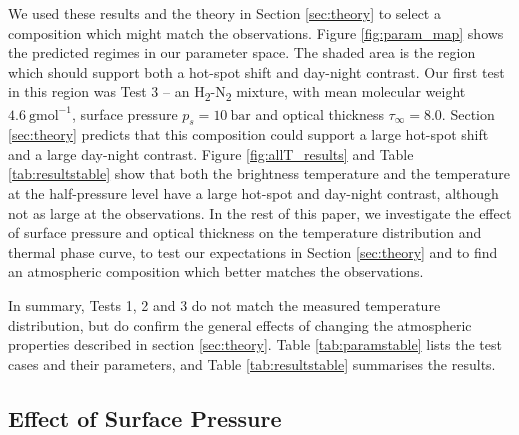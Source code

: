 We used these results and the theory in Section \ref{sec:theory} to select a composition which might match the observations. Figure \ref{fig:param_map} shows the predicted regimes in our parameter space. The shaded area is the region which should support both a hot-spot shift and day-night contrast. Our first test in this region was Test 3 -- an H\textsubscript{2}-N\textsubscript{2} mixture, with mean molecular weight $4.6\ \mathrm{gmol}^{-1}$, surface pressure $p_{s} = 10\ \mathrm{bar}$ and optical thickness $\tau_{\infty}= 8.0$. Section \ref{sec:theory} predicts that this composition could support a large hot-spot shift and a large day-night contrast. Figure \ref{fig:allT_results} and Table \ref{tab:resultstable} show that both the brightness temperature and the temperature at the half-pressure level have a large hot-spot and day-night contrast, although not as large at the observations. In the rest of this paper, we investigate the effect of surface pressure and optical thickness on the temperature distribution and thermal phase curve, to test our expectations in Section \ref{sec:theory} and to find an atmospheric composition which better matches the observations.

In summary, Tests 1, 2 and 3 do not match the measured temperature distribution, but do confirm the general effects of changing the atmospheric properties described in section \ref{sec:theory}. Table \ref{tab:paramstable} lists the test cases and their parameters, and Table \ref{tab:resultstable} summarises the results.


\subsection{Effect of Surface Pressure}\label{sec:ps_effect}

